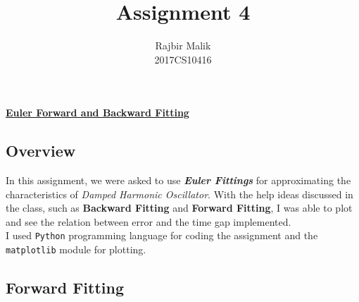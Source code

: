 \documentclass{article}
\title{Assignment 4}
\author{Rajbir Malik \\ 2017CS10416}
\begin{document}
    
    \maketitle
    
    \begin{center}
    \Large{\underline{\textbf{Euler Forward and Backward Fitting}}}
    \end{center}
    \subsection*{Overview}
    In this assignment, we were asked to use \textbf{\emph{Euler Fittings}} for approximating the characteristics of \textit{Damped Harmonic Oscillator}. With the help ideas discussed in the class, such as \textbf{Backward Fitting} and \textbf{Forward Fitting}, I was able to plot and see the relation between error and the time gap implemented.\\I used \texttt{Python} programming language for coding the assignment and the \texttt{matplotlib} module for plotting.
    
    \pagebreak
    \subsection*{Forward Fitting}
    
\end{document}
